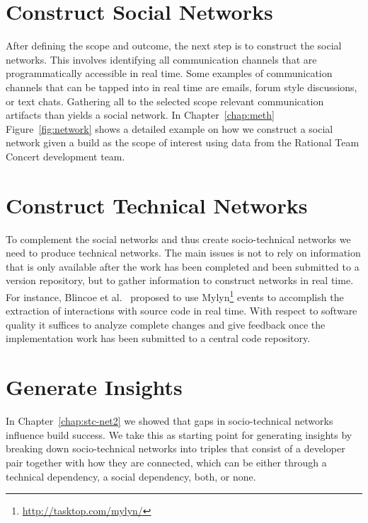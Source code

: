 \section{Construct Social Networks}
After  defining the scope and outcome, the next step is to construct the social networks.
This involves identifying all communication channels that are programmatically accessible in real time.
Some examples of communication channels that can be tapped into in real time are emails, forum style discussions, or text chats.
Gathering all to the selected scope relevant communication artifacts than yields a social network.
In Chapter~\ref{chap:meth} Figure~\ref{fig:network} shows a detailed  example on how we construct a social network given a build as the scope of interest using data from the Rational Team Concert development team.

\section{Construct Technical Networks}
To complement the social networks and thus create socio-technical networks we need to produce technical networks.
The main issues is not to rely on information that is only available after the work has been completed and been submitted to a version repository, but to gather information to construct networks in real time.
For instance, Blincoe et al.~\cite{blincoe:cscw:2012} proposed to use Mylyn\footnote{\url{http://tasktop.com/mylyn/}} events to accomplish the extraction of interactions with source code in real time.
%
With respect to software quality it suffices to analyze complete changes and give feedback once the implementation work has been submitted to a central code repository.

\section{Generate Insights}
In Chapter~\ref{chap:stc-net2} we showed that gaps in socio-technical networks influence build success.
We take this as starting point for generating insights by breaking down socio-technical networks into triples that consist of a developer pair together with how they are connected, which can be either through a technical dependency, a social dependency, both, or none.

